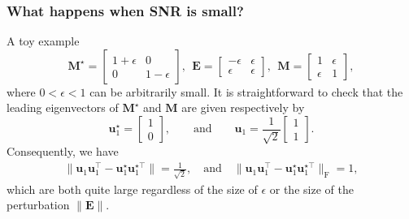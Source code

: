 \documentclass[compress,
mathserif,wide,%
]{beamer}
\begin{document}
\begin{frame}
	\frametitle{What happens when SNR is small?}
A toy example 	
	\[
\bm{M}^{\star}=\left[\begin{array}{cc}
1+\epsilon & 0\\
0 & 1-\epsilon
\end{array}\right],
~~
\bm{E}=\left[\begin{array}{cc}
-\epsilon & \epsilon\\
\epsilon & \epsilon
\end{array}\right],~~
\bm{M}=\left[\begin{array}{cc}
1 & \epsilon\\
\epsilon & 1
\end{array}\right],
\]
%
where $0<\epsilon<1$ can be arbitrarily small. It is straightforward
to check that the leading eigenvectors of $\bm{M}^{\star}$ and $\bm{M}$ are given respectively by
%
\[
\bm{u}_{1}^{\star}=\left[\begin{array}{c}
1\\
0
\end{array}\right],
\qquad\text{and}\qquad
\bm{u}_{1}=\frac{1}{\sqrt{2}} \left[\begin{array}{c}
1 \\
1
\end{array}\right] .
\]
%
Consequently, we have
%
\begin{align}
	\big\|\bm{u}_{1}\bm{u}_{1}^{\top} - \bm{u}_{1}^{\star}\bm{u}_{1}^{\star\top}\big\| = \frac{1}{\sqrt{2}}, 
	\quad \text{and} \quad
	\big\|\bm{u}_{1}\bm{u}_{1}^{\top} - \bm{u}_{1}^{\star}\bm{u}_{1}^{\star\top}\big\|_{\mathrm{F}}= 1,
\end{align}
%
which are both quite large regardless of the size of $\epsilon$ or the size of the perturbation $\|\bm{E}\|$.
\end{frame}
\end{document}
